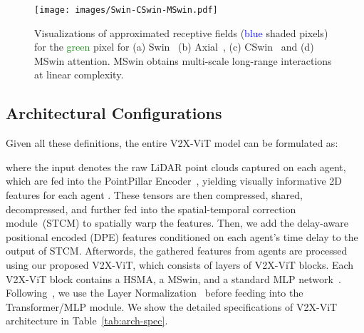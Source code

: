 \documentclass[runningheads]{llncs}
\begin{document}
\begin{figure}[!ht]
\centering
\texttt{[image: images/Swin-CSwin-MSwin.pdf]}
\caption{Visualizations of approximated receptive fields (\textcolor{blue}{blue} shaded pixels) for the \textcolor{green}{green} pixel for (a) Swin~\cite{liu2021swin} (b) Axial~\cite{wang2020axial}, (c) CSwin~\cite{dong2021cswin} and (d) MSwin attention. MSwin obtains multi-scale long-range interactions at linear complexity.}
\label{fig:visualization-mswin}
\vspace{-5mm}
\end{figure}


\subsection{Architectural Configurations}
\label{ssec:arch-config}

Given all these definitions, the entire V2X-ViT model can be formulated as:

where the input  denotes the raw LiDAR point clouds captured on each agent, which are fed into the PointPillar Encoder~\cite{lang2019pointpillars}, yielding visually informative 2D features  for each agent . These tensors are then compressed, shared,  decompressed, and further fed into the spatial-temporal correction module~(STCM) to spatially warp the features. Then, we add the delay-aware positional encoded (DPE) features conditioned on each agent's time delay  to the output of STCM. Afterwords, the gathered features from  agents are processed using our proposed V2X-ViT, which consists of  layers of V2X-ViT blocks. Each V2X-ViT block contains a HSMA, a MSwin, and a standard MLP network~\cite{dosovitskiy2020image}. Following~\cite{dosovitskiy2020image,liu2021swin}, we use the Layer Normalization~\cite{ba2016layer} before feeding into the Transformer/MLP module. We show the detailed specifications of V2X-ViT architecture in Table~\ref{tab:arch-spec}.
\end{document}
